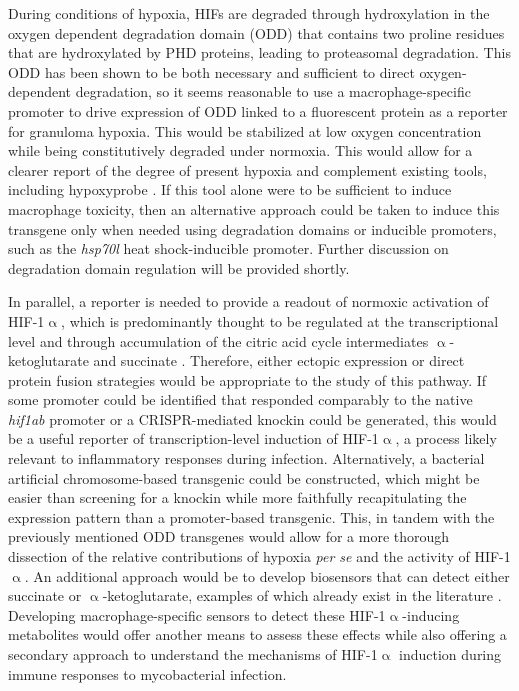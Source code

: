 During conditions of hypoxia, HIFs are degraded through hydroxylation in the oxygen dependent degradation domain (ODD) that contains two proline residues that are hydroxylated by PHD proteins, leading to proteasomal degradation. This ODD has been shown to be both necessary and sufficient to direct oxygen\hyp{}dependent degradation, so it seems reasonable to use a macrophage\hyp{}specific promoter to drive expression of ODD linked to a fluorescent protein as a reporter for granuloma hypoxia. This would be stabilized at low oxygen concentration while being constitutively degraded under normoxia. This would allow for a clearer report of the degree of present hypoxia and complement existing tools, including hypoxyprobe \citep{Cousins2016, Huang1998}. If this tool alone were to be sufficient to induce macrophage toxicity, then an alternative approach could be taken to induce this transgene only when needed using degradation domains or inducible promoters, such as the \textit{hsp70l} heat shock-inducible promoter. Further discussion on degradation domain regulation will be provided shortly.

In parallel, a reporter is needed to provide a readout of normoxic activation of HIF\hyp{}1$\upalpha$, which is predominantly thought to be regulated at the transcriptional level and through accumulation of the citric acid cycle intermediates $\upalpha$-ketoglutarate and succinate \citep{Meng2018, Palazon2014, Tannahill2013, Williams2018}. Therefore, either ectopic expression or direct protein fusion strategies would be appropriate to the study of this pathway. If some promoter could be identified that responded comparably to the native \textit{hif1ab} promoter or a CRISPR\hyp{}mediated knockin could be generated, this would be a useful reporter of transcription\hyp{}level induction of HIF\hyp{}1$\upalpha$, a process likely relevant to inflammatory responses during infection. Alternatively, a bacterial artificial chromosome-based transgenic could be constructed, which might be easier than screening for a knockin while more faithfully recapitulating the expression pattern than a promoter-based transgenic. This, in tandem with the previously mentioned ODD transgenes would allow for a more thorough dissection of the relative contributions of hypoxia \textit{per se} and the activity of HIF\hyp{}1$\upalpha$. An additional approach would be to develop biosensors that can detect either succinate or $\upalpha$-ketoglutarate, examples of which already exist in the literature \citep{Liu2017b, Suzuki2021, Luddecke2017}. Developing macrophage-specific sensors to detect these HIF-1$\upalpha$-inducing metabolites would offer another means to assess these effects while also offering a secondary approach to understand the mechanisms of HIF-1$\upalpha$ induction during immune responses to mycobacterial infection. 

